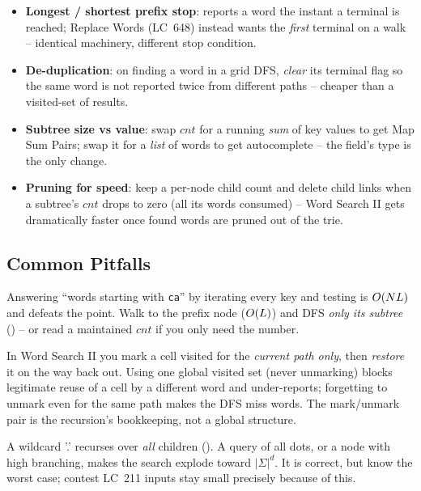 \begin{itemize}[nosep]
  \item \textbf{Longest / shortest prefix stop}:  reports a word the instant a
        terminal is reached; Replace Words (LC~648) instead wants the \emph{first} terminal on a walk --
        identical machinery, different stop condition. \hfill{}
  \item \textbf{De-duplication}: on finding a word in a grid DFS, \emph{clear} its terminal flag so the
        same word is not reported twice from different paths -- cheaper than a visited-set of results.
        \hfill{}
  \item \textbf{Subtree size vs value}: swap $\mathit{cnt}$ for a running \emph{sum} of key values to get
        Map Sum Pairs; swap it for a \emph{list} of words to get autocomplete -- the field's type is the
        only change. \hfill{}
  \item \textbf{Pruning for speed}: keep a per-node child count and delete child links when a subtree's
        $\mathit{cnt}$ drops to zero (all its words consumed) -- Word Search II gets dramatically faster
        once found words are pruned out of the trie. \hfill{}
\end{itemize}

\subsection{Common Pitfalls}

\begin{warningbox}
Answering ``words starting with \texttt{ca}'' by iterating every key and testing  is
$O(N L)$ and defeats the point. Walk to the prefix node ($O(L)$) and DFS \emph{only its subtree}
() -- or read a maintained $\mathit{cnt}$ if you only need the number.
\end{warningbox}
\begin{warningbox}
In Word Search II you mark a cell visited for the \emph{current path only}, then \emph{restore} it on the
way back out. Using one global visited set (never unmarking) blocks legitimate reuse of a cell by a
different word and under-reports; forgetting to unmark even for the same path makes the DFS miss words.
The mark/unmark pair is the recursion's bookkeeping, not a global structure.
\end{warningbox}
\begin{warningbox}
A wildcard '.' recurses over \emph{all} children (). A query of all dots, or a node
with high branching, makes the search explode toward $|\Sigma|^{d}$. It is correct, but know the worst
case; contest LC~211 inputs stay small precisely because of this.
\end{warningbox}

